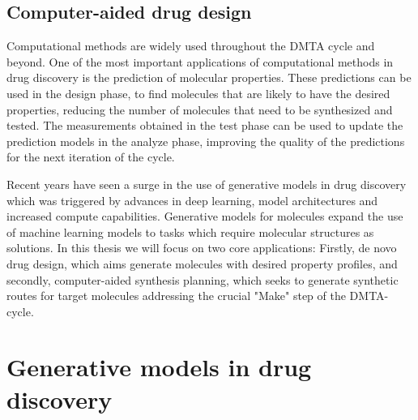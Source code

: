 \subsection{Computer-aided drug design}
Computational methods are widely used throughout the DMTA cycle and beyond. One of the most important
applications of computational methods in drug discovery is the prediction of molecular properties.
These predictions can be used in the design phase, to find molecules that are likely to have the desired
properties, reducing the number of molecules that need to be synthesized and tested. The measurements
obtained in the test phase can be used to update the prediction models in the analyze phase, improving
the quality of the predictions for the next iteration of the cycle.

Recent years have seen a surge in the use of generative models in drug discovery which was triggered
by advances in deep learning, model architectures and increased compute capabilities. Generative
models for molecules expand the use of machine learning models to tasks which require molecular
structures as solutions. In this thesis we will focus on two core applications: Firstly, de novo
drug design, which aims generate molecules with desired property profiles, and secondly,
computer-aided synthesis planning, which seeks to generate synthetic routes for target molecules
addressing the crucial "Make" step of the DMTA-cycle.

\section{Generative models in drug discovery}
